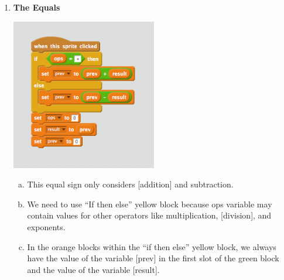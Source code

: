 \documentclass[11pt]{article}
\begin{document}
\begin{enumerate}
\item \textbf{The Equals}
\begin{center}
  \includegraphics[width=2.5in]{equals.png}
 \end{center}
\begin{enumerate}[a.]
\item This equal sign only considers [addition] and subtraction.
\item We need to use ``If then else'' yellow block because ops variable may contain values for other operators like multiplication, [division], and exponents.
\item In the orange blocks within the ``if then else'' yellow block, we always have the value of the variable [prev] in the first slot of the green block and the value of the variable [result].
\end{enumerate}
\end{enumerate}
\end{document}

